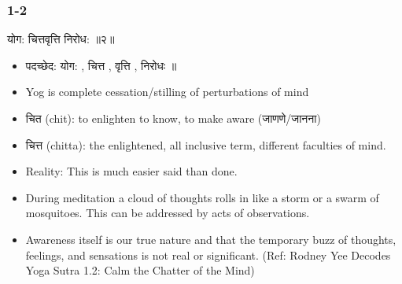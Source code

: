 \begin{frame}[fragile]\frametitle{1-2}

\begin{sanskrit}
योग: चित्तवृत्ति निरोध:  ॥२॥
\end{sanskrit}

	\begin{itemize}
	\item पदच्छेद: योग: , चित्त , वृत्ति , निरोधः ॥
	\item Yog is complete cessation/stilling of perturbations of mind
	\item चित (chit): to enlighten to know, to make aware (जाणणे/जानना)
	\item चित्त (chitta): the enlightened, all inclusive term, different faculties of mind.
	\item Reality: This is much easier said than done. 
	\item During meditation a cloud of thoughts rolls in like a storm or a swarm of mosquitoes. This can be addressed by acts of observations. \item Awareness itself is our true nature and that the temporary buzz of thoughts, feelings, and sensations is not real or significant. ({\tiny Ref: Rodney Yee Decodes Yoga Sutra 1.2: Calm the Chatter of the Mind})
	\end{itemize}

\end{frame}


